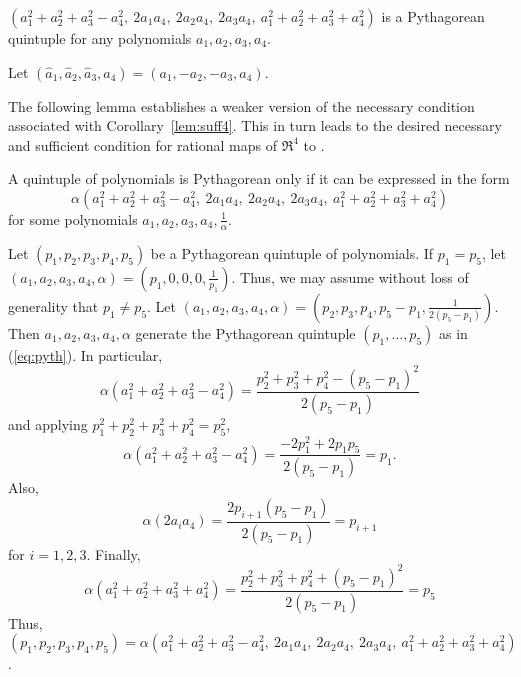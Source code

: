 \documentclass[11pt]{article}
\begin{document}
\begin{corollary}
\label{lem:suff4}
$(a_1^2 + a_2^2 + a_3^2 - a_4^2,\ 2a_1a_4,\ 2a_2a_4,\ 2a_3a_4,\ 
 a_1^2 + a_2^2 + a_3^2 + a_4^2)$
is a Pythagorean quintuple for any polynomials $a_1,a_2,a_3,a_4$.
\end{corollary}
\prf
Let $(\hat{a}_1,\hat{a}_2,\hat{a}_3,\hat{a}_4) = (a_1,-a_2,-a_3,a_4)$. 
\QED

\noindent The following lemma establishes a weaker version of the necessary condition
associated with Corollary~\ref{lem:suff4}.
This in turn leads to the desired necessary and sufficient condition for rational maps
of $\Re^4$ to \Sn{3}.

\begin{lemma}
\label{thm:necessary4}
A quintuple of polynomials is Pythagorean only if it can be expressed in the form
\begin{equation}
\label{eq:pyth}
	\alpha (a_1^2 + a_2^2 + a_3^2 - a_4^2,
		\ 2a_1a_4,\ 2a_2a_4,\ 2a_3a_4,
		\ a_1^2 + a_2^2 + a_3^2 + a_4^2)
\end{equation}
for some polynomials $a_1,a_2,a_3,a_4,\frac{1}{\alpha}$.
\end{lemma}
\prf
Let $(p_1,p_2,p_3,p_4,p_5)$ be a Pythagorean quintuple of polynomials.
If $p_1 = p_5$, let\\
$(a_1,a_2,a_3,a_4,\alpha) = (p_1,0,0,0,\frac{1}{p_1})$.
Thus, we may assume without loss of generality that $p_1 \neq p_5$.
Let $(a_1,a_2,a_3,a_4,\alpha) = (p_2,p_3,p_4,p_5-p_1,\frac{1}{2(p_5 - p_1)})$.
Then $a_1,a_2,a_3,a_4,\alpha$ generate the Pythagorean quintuple
$(p_1,\ldots,p_5)$ as in (\ref{eq:pyth}).
In particular,
\[
\alpha (a_1^2 + a_2^2 + a_3^2 - a_4^2)
= \frac{p_2^2 + p_3^2 + p_4^2 - (p_5 - p_1)^2}{2(p_5-p_1)}
\]
and applying $p_1^2 + p_2^2 + p_3^2 + p_4^2 = p_5^2$,
\[
\alpha (a_1^2 + a_2^2 + a_3^2 - a_4^2) = \frac{-2p_1^2 + 2p_1p_5}{2(p_5 - p_1)} = p_1.
\]
Also, 
\[
\alpha (2a_i a_4) = \frac{2p_{i+1}(p_5 - p_1)}{2(p_5 - p_1)} = p_{i+1}
\]
for $i=1,2,3$.
Finally, 
\[
\alpha(a_1^2 + a_2^2 + a_3^2 + a_4^2) 
= \frac{p_2^2 + p_3^2 + p_4^2 + (p_5 - p_1)^2}{2(p_5-p_1)} = p_5
\]
Thus, $(p_1,p_2,p_3,p_4,p_5) = \alpha (a_1^2 + a_2^2 + a_3^2 - a_4^2,
		\ 2a_1a_4,\ 2a_2a_4,\ 2a_3a_4,
		\ a_1^2 + a_2^2 + a_3^2 + a_4^2)$.
\QED
\end{document}

